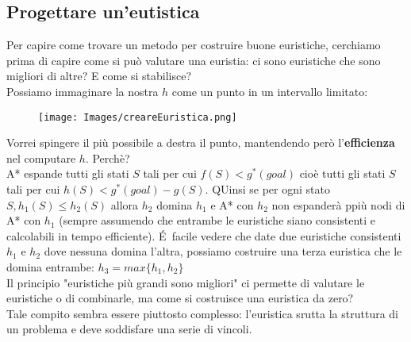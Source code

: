 \documentclass{article}
\begin{document}
\subsection{Progettare un'eutistica}
Per capire come trovare un metodo per costruire buone euristiche, cerchiamo prima di capire come si può valutare una euristia: ci sono euristiche che sono migliori di altre? E come si stabilisce?
\\ Possiamo immaginare la nostra $h$ come un punto in un intervallo limitato:
\begin{figure}[H]
    \centering
    \texttt{[image: Images/creareEuristica.png]}
\end{figure}
Vorrei spingere il più possibile a destra il punto, mantendendo però l'\textbf{efficienza} nel computare $h$. Perchè?
\\ A* espande tutti gli stati $S$ tali per cui $f(S)<g^*(goal)$ cioè tutti gli stati $S$ tali per cui $h(S)<g^*(goal)-g(S)$. QUinsi se per ogni stato $S,h_1(S) \leq h_2(S)$ allora $h_2$ domina $h_1$ e A* con $h_2$ non espanderà ppiù nodi di A* con $h_1$ (sempre assumendo che entrambe le euristiche siano consistenti e calcolabili in tempo efficiente). \'E\ facile vedere che date due euristiche consistenti $h_1$ e $h_2$ dove nessuna domina l'altra, possiamo costruire una terza euristica che le domina entrambe: $h_3 = max\{h_1,h_2\}$
\\ Il principio "euristiche più grandi sono migliori" ci permette di valutare le euristiche o di combinarle, ma come si costruisce una euristica da zero?
\\ Tale compito sembra essere piuttosto complesso: l'euristica srutta la struttura di un problema e deve soddisfare una serie di vincoli. 
\end{document}
